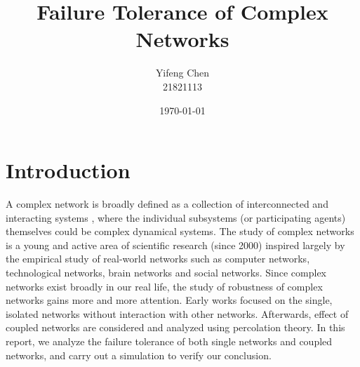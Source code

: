 \documentclass[11pt]{article}
\title{Failure Tolerance of Complex Networks}
\author{Yifeng Chen \\
21821113}
\date{\today}
\begin{document}
\maketitle

\section{Introduction}
A complex network is broadly defined as a collection of interconnected and interacting systems \cite{albert2002statistical}, where the individual subsystems (or participating agents) themselves could be complex dynamical systems. The study of complex networks is a young and active area of scientific research (since 2000) inspired largely by the empirical study of real-world networks such as computer networks, technological networks, brain networks and social networks\cite{lu2013theory}. 
Since complex networks exist broadly in our real life, the study of robustness of complex networks gains more and more attention. Early works focused on the single, isolated networks without interaction with other networks\cite{albert2000error, schneider2011mitigation}. Afterwards, effect of coupled networks are considered and analyzed using percolation theory\cite{buldyrev2010catastrophic}. In this report, we analyze the failure tolerance of both single networks and coupled networks, and carry out a simulation to verify our conclusion.
\end{document}
